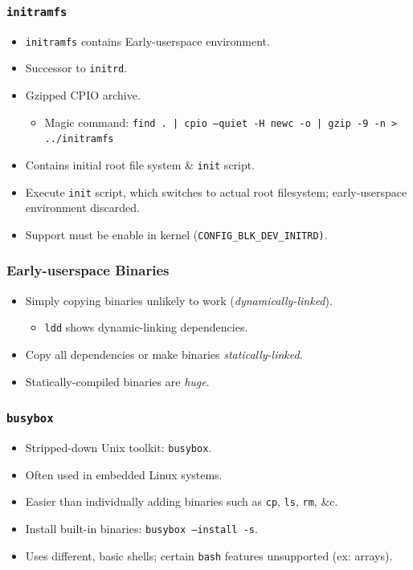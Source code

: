 \documentclass[xcolor={dvipsnames,svgnames},hyperref=dvips]{beamer}
\begin{document}
	\begin{frame}
		\frametitle{\texttt{initramfs}}
		\begin{itemize}
		\item \texttt{initramfs} contains Early-userspace environment.
		\item Successor to \texttt{initrd}.
		\item Gzipped CPIO archive.
			\begin{itemize}
			\item Magic command: \texttt{find . | cpio --quiet -H newc -o | gzip -9 -n > ../initramfs}
			\end{itemize}
		\item Contains initial root file system \& \texttt{init} script.
		\item Execute \texttt{init} script, which switches to actual root filesystem; early-userspace environment discarded.
		\item Support must be enable in kernel (\texttt{CONFIG\_BLK\_DEV\_INITRD)}.
		\end{itemize}
	\end{frame}

	\begin{frame}
		\frametitle{Early-userspace Binaries}
		\begin{itemize}
		\item Simply copying binaries unlikely to work (\textit{dynamically-linked}).
			\begin{itemize}
			\item \texttt{ldd} shows dynamic-linking dependencies.
			\end{itemize}
		\item Copy all dependencies or make binaries \textit{statically-linked}.
		\item Statically-compiled binaries are \textit{huge}.
		\end{itemize}
	\end{frame}

	\begin{frame}
		\frametitle{\texttt{busybox}}
		\begin{itemize}
		\item Stripped-down Unix toolkit: \texttt{busybox}.
		\item Often used in embedded Linux systems.
		\item Easier than individually adding binaries such as \texttt{cp}, \texttt{ls}, \texttt{rm}, \&c.
		\item Install built-in binaries: \texttt{busybox --install -s}.
		\item Uses different, basic shells; certain \texttt{bash} features unsupported (ex: arrays).
		\end{itemize}
	\end{frame}
\end{document}

